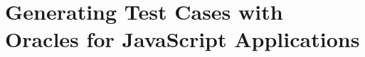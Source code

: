 \chapter{Generating Test Cases with Oracles for JavaScript Applications} \label{Chap:jseft} 








% 




